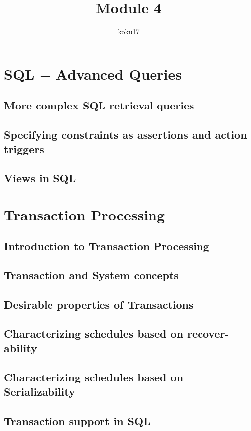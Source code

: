 \documentclass{article}
\title{Module 4}
\author{koku17}
\begin{document}
	\maketitle \thispagestyle{empty} \newpage
	\tableofcontents \thispagestyle{empty} \newpage
	\section{SQL $-$ Advanced Queries}
	\subsection{More complex SQL retrieval queries}
	\subsection{Specifying constraints as assertions and action triggers}
	\subsection{Views in SQL}

	\section{Transaction Processing}
	\subsection{Introduction to Transaction Processing}
	\subsection{Transaction and System concepts}
	\subsection{Desirable properties of Transactions}
	\subsection{Characterizing schedules based on recover-ability}
	\subsection{Characterizing schedules based on Serializability}
	\subsection{Transaction support in SQL}
\end{document}

